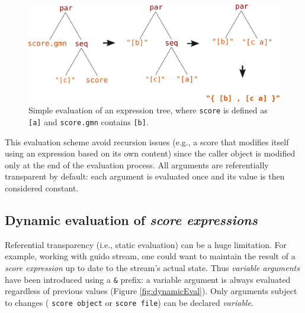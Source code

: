 \documentclass{article}
\newcommand{\OSC}[1]{{\fontsize{10pt}{10pt} \selectfont\texttt{#1}}}
\newcommand{\sExpr}{\emph{score expressions}}
\begin{document}
\begin{figure}[th]
\centering
\includegraphics[width=1\columnwidth]{imgs/classicEval}
\caption{Simple evaluation of an expression tree,
where \OSC{score} is defined as \OSC{[a]}
and \OSC{score.gmn} contains \OSC{[b]}.
\label{fig:classicEval} }
\end{figure}

This evaluation scheme avoid recursion issues (e.g., a score that modifies itself using an expression based on its own content) since the caller object is modified only at the end of the evaluation process. All arguments are referentially transparent by default: each argument is evaluated once and its value is then considered constant.

\subsection{Dynamic evaluation of \sExpr}

Referential transparency (i.e., static evaluation) can be a huge limitation. For example, working with guido stream, one could want to maintain the result of a \emph{score expression} up to date to the stream's actual state.
Thus \emph{variable arguments} have been introduced using a \OSC{\&} prefix: a variable argument is always evaluated regardless of previous values (Figure \ref{fig:dynamicEval}). Only arguments subject to changes (\OSC{score object} or \OSC{score file}) can be declared \emph{variable}.
\end{document}
